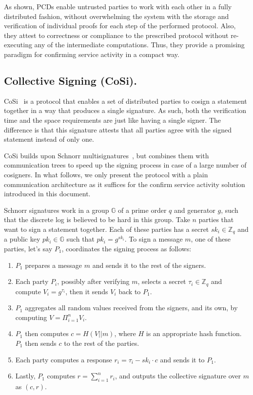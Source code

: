 As shown, PCDs enable untrusted parties to work with each other in a fully distributed fashion, without overwhelming the system with the storage and verification of individual proofs for each step of the performed protocol. Also, they attest to correctness or compliance  to the prescribed protocol without re-executing any of the intermediate computations. Thus, they provide a promising paradigm for confirming service activity in a compact way.


\subsection{Collective Signing (CoSi).}
\label{cosi}
CoSi~\cite{syta2016keeping} is a protocol that enables a set of distributed parties to cosign a statement together in a way that produces a single signature. As such, both the verification time and the space requirements are just like having a single signer. The difference is that this signature attests that all parties agree with the signed 
statement instead of only one.


CoSi builds upon Schnorr multisignatures~\cite{schnorr1991efficient, bellare2006multi, micali2001accountable}, but combines them with communication trees to speed up the signing process in case of a large number of cosigners. In what follows, we only present the protocol with a plain communication architecture as it suffices for the confirm service activity solution introduced in this document.


Schnorr signatures work in a group $\mathbb{G}$ of a prime order $q$ and generator $g$, such that the discrete log is believed to be hard in this group. Take $n$ parties that want to sign a statement together. Each of these parties has a secret $sk_i \in \mathbb{Z}_q$ and a public key $pk_i \in \mathbb{G}$ such that $pk_i = g^{sk_i}$. To sign a message $m$, one of these parties, let's say $P_1$, coordinates the signing process as follows: 
\begin{enumerate}
\setlength{\itemsep}{0pt}
\item $P_1$ prepares a message $m$ and sends it to the rest of the signers.

\item Each party $P_i$, possibly after verifying $m$, selects a secret $\tau_i \in \mathbb{Z}_q$ and compute $V_i = g^{\tau_i}$, then it sends $V_i$ back to $P_1$.

\item $P_1$ aggregates all random values received from the signers, and its own, by computing $V = \Pi_{i =1}^n V_i$.

\item $P_1$ then computes $c = H(V||m)$, where $H$ is an appropriate hash function. $P_1$ then sends $c$ to the rest of the parties.

\item Each party computes a response $r_i = \tau_i - sk_i\cdot c$ and sends it to $P_1$.

\item Lastly, $P_1$ computes $r = \sum_{i=1}^n r_i$, and outputs the collective signature over $m$ as $(c, r)$.
\end{enumerate}


